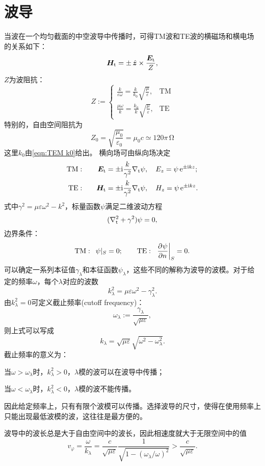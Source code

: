 \section{波导}
当波在一个均匀截面的中空波导中传播时，可得TM波和TE波的横磁场和横电场的关系如下：
\[
    \bm H_\text t=\pm\mathop{}\!\hat{\bm{z}}\times\frac{\bm E_\text t}Z,
\]
$Z$为波阻抗：
\[
    Z:=\begin{cases}
        \frac k{\varepsilon\omega}=\frac k{k_0}\sqrt{\frac\mu\varepsilon},&\text{TM}\\
        \frac {\mu\omega}k=\frac {k_0}k\sqrt{\frac\mu\varepsilon},&\text{TE}
    \end{cases}
\]
特别的，自由空间阻抗为
\begin{equation}
    Z_0=\sqrt{\frac{\mu_0}{\varepsilon_0}}=\mu_0c\simeq 120\pi\,\si{\ohm}
\end{equation}
这里$k_0$由\eqref{eqn:TEM k0}给出。
横向场可由纵向场决定
\begin{alignat*}{2}
    \text{TM}&:\quad&\bm E_\text t&=\pm\mathrm{i}\frac k{\gamma^2}\nabla_\text t\psi,\quad E_z=\psi\mathop{}\!\mathrm{e}^{\pm\mathrm{i} kz};\\
    \text{TE}&:\quad&\bm H_\text t&=\pm\mathrm{i}\frac k{\gamma^2}\nabla_\text t\psi,\quad H_z=\psi\mathop{}\!\mathrm{e}^{\pm\mathrm{i} kz}.
\end{alignat*}
式中$\gamma^2=\mu\varepsilon\omega^2-k^2$，标量函数$\psi$满足二维波动方程
\[
    (\nabla^2_\text t+\gamma^2)\psi=0,
\]
边界条件：
\[
    \text{TM}:\enspace\psi|_S=0;\qquad\text{TE}:\enspace\left.\frac{\partial^{{}}\psi}{\partial{n}^{{}}}\right\rvert_S=0.
\]
可以确定一系列本征值$\gamma_\lambda$和本征函数$\psi_\lambda$，这些不同的解称为波导的波模。对于给定的频率$\omega$，每个$\lambda$对应的波数
\[
    k_\lambda^2=\mu\varepsilon\omega^2-\gamma_\lambda^2.
\]
由$k_\lambda^2=0$可定义截止频率(cutoff frequency)：
\begin{equation}
    \label{eqn:cutoff omega}
    \omega_\lambda:=\frac{\gamma_\lambda}{\sqrt{\mu\varepsilon}},
\end{equation}
则上式可以写成
\[
    k_\lambda=\sqrt{\mu\varepsilon}\sqrt{\omega^2-\omega_\lambda^2}.
\]
截止频率的意义为：
\begin{compactitem}
    \item 当$\omega>\omega_\lambda$时，$k_\lambda^2>0$，$\lambda$模的波可以在波导中传播；
    \item 当$\omega<\omega_\lambda$时，$k_\lambda^2<0$，$\lambda$模的波不能传播。
\end{compactitem}
因此给定频率上，只有有限个波模可以传播。选择波导的尺寸，使得在使用频率上只能出现最低波模的波，这往往是最方便的。

波导中的波长总是大于自由空间中的波长，因此相速度就大于无限空间中的值
\[
    v_\varphi=\frac\omega{k_\lambda}=\frac c{\sqrt{\mu\varepsilon}}\frac1{\sqrt{1-(\omega_\lambda/\omega)^2}}>\frac c{\sqrt{\mu\varepsilon}}.
\]
